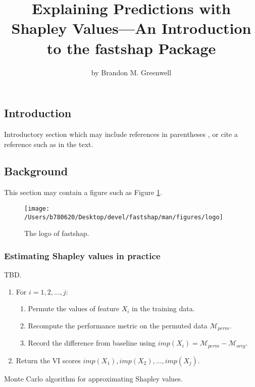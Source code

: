 \title{Explaining Predictions with Shapley Values---An Introduction to the
fastshap Package}
\author{by Brandon M. Greenwell}

\maketitle


\hypertarget{introduction}{%
\subsection{Introduction}\label{introduction}}

Introductory section which may include references in parentheses
\citep{R}, or cite a reference such as \citet{R} in the text.

\hypertarget{background}{%
\subsection{Background}\label{background}}

This section may contain a figure such as Figure \ref{fig:Rlogo}.

\begin{Schunk}
\begin{figure}[htbp]

{\centering \texttt{[image: /Users/b780620/Desktop/devel/fastshap/man/figures/logo]} 

}

\caption[The logo of fastshap]{The logo of fastshap.}\label{fig:Rlogo}
\end{figure}
\end{Schunk}

\hypertarget{estimating-shapley-values-in-practice}{%
\subsubsection{Estimating Shapley values in
practice}\label{estimating-shapley-values-in-practice}}

TBD.

\begin{algorithm}
\begin{enumerate}
  \item For $i = 1, 2, \dots, j$:
  \begin{enumerate}
    \item Permute the values of feature $X_i$ in the training data.
    \item Recompute the performance metric on the permuted data $\mathcal{M}_{perm}$.
    \item Record the difference from baseline using $imp\left(X_i\right) = \mathcal{M}_{perm} - \mathcal{M}_{orig}$.
  \end{enumerate}
  \item Return the VI scores $imp\left(X_1\right), imp\left(X_2\right), \dots, imp\left(X_j\right)$.
\end{enumerate}
\caption{Monte Carlo algorithm for approximating Shapley values. \label{alg:permute}}
\end{algorithm}

